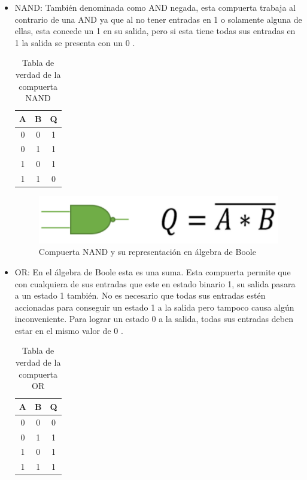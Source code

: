 \documentclass[journal]{IEEEtran}
\begin{document}
\begin{itemize}
		\item NAND: También denominada como AND negada, esta compuerta trabaja al contrario de una AND ya que al no tener entradas en 1 o solamente alguna de ellas, esta concede un 1 en su salida, pero si esta tiene todas sus entradas en 1 la salida se presenta con un 0 \cite{LOGICBUS}.
		
		\begin{table}[ht]
			\centering
			\begin{tabular}{|c|c|c|}
				\hline
				A & B & Q \\
				\hline
				\hline
				0 & 0 & 1 \\
				\hline
				0 & 1 & 1 \\
				\hline
				1 & 0 & 1 \\
				\hline
				1 & 1 & 0 \\
				\hline
			\end{tabular}
			\caption{Tabla de verdad de la compuerta NAND}
			\label{tab:NAND}
		\end{table}
		
		\begin{figure}[!htb]
			\centering
			\includegraphics[scale = 0.35]{img/NAND.png}
			\caption{Compuerta NAND y su representación en álgebra de Boole \cite{LOGICBUS}}
			\label{fig:NAND}
		\end{figure}
		
		\item OR: En el álgebra de Boole esta es una suma. Esta compuerta permite que con cualquiera de sus entradas que este en estado binario 1, su salida pasara a un estado 1 también. No es necesario que todas sus entradas estén accionadas para conseguir un estado 1 a la salida pero tampoco causa algún inconveniente. Para lograr un estado 0 a la salida, todas sus entradas deben estar en el mismo valor de 0 \cite{LOGICBUS}.
		
		\begin{table}[ht]
			\centering
			\begin{tabular}{|c|c|c|}
				\hline
				A & B & Q \\
				\hline
				\hline
				0 & 0 & 0 \\
				\hline
				0 & 1 & 1 \\
				\hline
				1 & 0 & 1 \\
				\hline
				1 & 1 & 1 \\
				\hline
			\end{tabular}
			\caption{Tabla de verdad de la compuerta OR}
			\label{tab:OR}
		\end{table}
		

\end{itemize}
\end{document}

